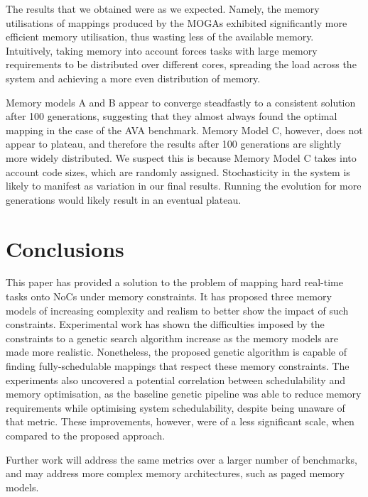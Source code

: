 \documentclass[10pt,conference]{IEEEtran}
\begin{document}
The results that we obtained were as we expected. Namely, the memory utilisations of mappings produced by the MOGAs exhibited significantly more efficient memory utilisation, thus wasting less of the available memory. Intuitively, taking memory into account forces tasks with large memory requirements to be distributed over different cores, spreading the load across the system and achieving a more even distribution of memory.

Memory models A and B appear to converge steadfastly to a consistent solution after 100 generations, suggesting that they almost always found the optimal mapping in the case of the AVA benchmark. Memory Model C, however, does not appear to plateau, and therefore the results after 100 generations are slightly more widely distributed. We suspect this is because Memory Model C takes into account code sizes, which are randomly assigned. Stochasticity in the system is likely to manifest as variation in our final results. Running the evolution for more generations would likely result in an eventual plateau.

\section{Conclusions}\label{sec:conclusions}

This paper has provided a solution to the problem of mapping hard real-time tasks onto NoCs under memory constraints. It has proposed three memory models of increasing complexity and realism to better show the impact of such constraints. Experimental work has shown the difficulties imposed by the constraints to a genetic search algorithm increase as the memory models are made more realistic. Nonetheless, the proposed genetic algorithm is capable of finding fully-schedulable mappings that respect these memory constraints. The experiments also uncovered a potential correlation between schedulability and memory optimisation, as the baseline genetic pipeline was able to reduce memory requirements while optimising system schedulability, despite being unaware of that metric. These improvements, however, were of a less significant scale, when compared to the proposed approach.

Further work will address the same metrics over a larger number of benchmarks, and may address more complex memory architectures, such as paged memory models.



\end{document}
